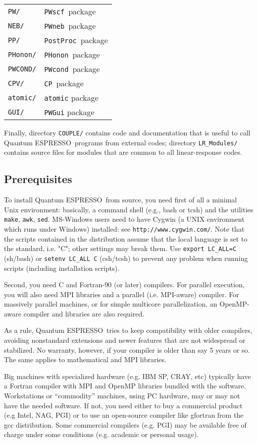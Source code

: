 \documentclass[12pt,a4paper]{article}
\def\qe{{\sc Quantum ESPRESSO}}
\def\PWscf{\texttt{PWscf}}
\def\PHonon{\texttt{PHonon}}
\def\CP{\texttt{CP}}
\def\PostProc{\texttt{PostProc}}
\def\NEB{\texttt{PWneb}} %
\def\make{\texttt{make}}
\begin{document}
\begin{tabular}{ll}
\texttt{PW/}      & \PWscf\ package\\
\texttt{NEB/}     & \NEB\ package\\
\texttt{PP/}      & \PostProc\ package\\
\texttt{PHonon/}  & \PHonon\ package\\
\texttt{PWCOND/}  & \texttt{PWcond}\ package\\
\texttt{CPV/}     & \CP\ package\\
\texttt{atomic/}  & \texttt{atomic} package\\
\texttt{GUI/}     & \texttt{PWGui} package\
\end{tabular}

Finally, directory \texttt{COUPLE/} contains code and documentation
that is useful to call \qe\ programs from external codes; directory
\texttt{LR\_Modules/} contains source files for modules that are common
to all linear-response codes.
\subsection{Prerequisites}
\label{Sec:Installation}

To install \qe\ from source, you need first of all a minimal Unix
environment: basically, a command shell (e.g.,
bash or tcsh) and the utilities \make, \texttt{awk}, \texttt{sed}.
 MS-Windows users need to have Cygwin (a UNIX environment which
 runs under Windows) installed:
see \texttt{http://www.cygwin.com/}. Note that the scripts contained
in the distribution assume that the local  language is set to the
standard, i.e. "C"; other settings
may break them. Use \texttt{export LC\_ALL=C} (sh/bash) or
\texttt{setenv LC\_ALL C} (csh/tcsh) to prevent any problem
when running scripts (including installation scripts).

Second, you need C and Fortran-90 (or later) compilers. For parallel
execution, you will also need MPI libraries and a parallel
(i.e. MPI-aware) compiler. For massively parallel machines, or
for simple multicore parallelization, an OpenMP-aware compiler
and libraries are also required.

As a rule, \qe\ tries to keep compatibility with older compilers,
avoiding nonstandard extensions and newer features that
are not widespread or stabilized. No warranty, however, if
your compiler is older than say 5 years or so. The same applies to
mathematical and MPI libraries.

Big machines with
specialized hardware (e.g. IBM SP, CRAY, etc) typically have a
Fortran compiler with MPI and OpenMP libraries bundled with
the software. Workstations or ``commodity'' machines, using PC
hardware, may or may not have the needed software. If not, you need
either to buy a commercial product (e.g Intel, NAG, PGI) or to
use an open-source compiler like gfortran from the gcc distribution.
Some commercial compilers (e.g. PGI) may be available free of charge 
under some conditions (e.g. academic or personal usage).
\end{document}
